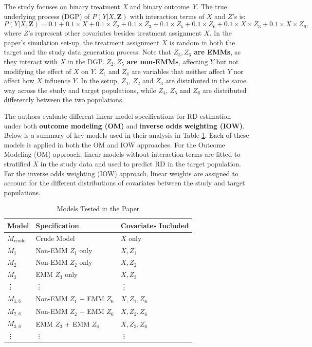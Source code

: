 \documentclass[12pt,oneside]{amsart}
\theoremstyle{definition}
\theoremstyle{remark}
\numberwithin{equation}{section}
\begin{document}
The study focuses on binary treatment \textit{X} and binary outcome \textit{Y}. The true underlying process (DGP) of $P(Y|X, \textbf{Z}) $ with interaction terms of $X$ and $Z$'s is: $$P(Y|X, \textbf{Z}) = 0.1 + 0.1 \times X + 0.1 \times Z_2 + 0.1 \times Z_3 + 0.1\times Z_5 + 0.1 \times Z_6 + 0.1 \times X\times  Z_3 + 0.1 \times X \times Z_6,$$ where $Z$'s represent other covariates besides treatment assignment $X$. In the paper's simulation set-up, the treatment assignment $X$ is random in both the target and the study data generation process. Note that \textbf{$Z_3, Z_6$ are EMMs}, as they interact with $X$ in the DGP. \textbf{$Z_2, Z_5$ are non-EMMs}, affecting $Y$ but not modifying the effect of $X$ on $Y$. $Z_1$ and $Z_4$ are variables that neither affect $Y$ nor affect how $X$ influence $Y$. In the setup, $Z_1$, $Z_2$ and $Z_3$ are distributed in the same way across the study and target populations, while $Z_4$, $Z_5$ and $Z_6$ are distributed differently between the two populations. 

The authors evaluate different linear model specifications for RD estimation under both \textbf{outcome modeling (OM)} and \textbf{inverse odds weighting (IOW)}. Below is a summary of key models used in their analysis in Table \ref{tab:model}. Each of these models is applied in both the OM and IOW approaches. For the Outcome Modeling (OM) approach, linear models without interaction terms are fitted to stratified $X$ in the study data and used to predict RD in the target population. For the inverse odds weighting (IOW) approach, linear weights are assigned to account for the different distributions of covariates between the study and target populations. 

\begin{table}[h]
    \centering
    \begin{tabular}{lll}
        \toprule
        \textbf{Model} & \textbf{Specification} & \textbf{Covariates Included} \\
        \midrule
        \( M_{\text{crude}} \) & Crude Model & \( X \) only \\
        \( M_1 \) & Non-EMM \( Z_1 \) only & \( X, Z_1 \) \\
        
        \( M_2 \) & Non-EMM \( Z_2 \) only & \( X, Z_2 \) \\
        \( M_3 \) & EMM \( Z_3 \) only & \( X, Z_3 \) \\  
        \vdots & \vdots & \vdots\\
        
        \( M_{1,6} \) & Non-EMM \( Z_1 \) + EMM \( Z_6 \) & \( X, Z_1, Z_6 \) \\
        \( M_{2,6} \) & Non-EMM \( Z_2 \) + EMM \( Z_6 \) & \( X, Z_2, Z_6 \) \\
        \( M_{3,6} \) & EMM \( Z_3 \) + EMM \( Z_6 \) & \( X, Z_3, Z_6 \) \\
        \vdots & \vdots & \vdots\\

        \bottomrule
    \end{tabular}
    \caption{Models Tested in the Paper}
    \label{tab:model}
\end{table}
\end{document}
